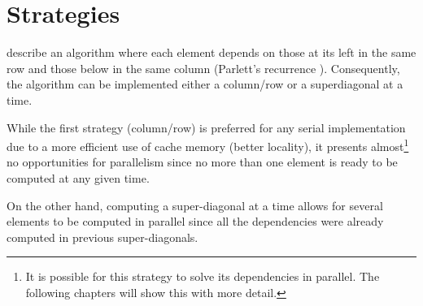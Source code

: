 \documentclass[../thesis]{subfiles}
\begin{document}
	\section{Strategies}
	\label{sec:case:strategy}

	 describe an algorithm where each element depends on those at its left in the same row and those below in the same column (Parlett's recurrence \cite{Parlett:1976}). Consequently, the algorithm can be implemented either a column/row or a superdiagonal at a time.

	

	While the first strategy (column/row) is preferred for any serial implementation due to a more efficient use of cache memory (better locality), it presents almost\footnote{It is possible for this strategy to solve its dependencies in parallel. The following chapters will show this with more detail.} no opportunities for parallelism since no more than one element is ready to be computed at any given time.

	On the other hand, computing a super-diagonal at a time allows for several elements to be computed in parallel since all the dependencies were already computed in previous super-diagonals.
\end{document}
